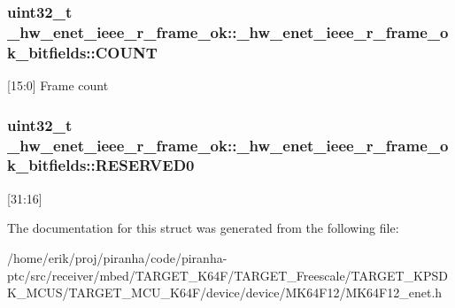 \subsubsection[{\texorpdfstring{C\+O\+U\+NT}{COUNT}}]{\setlength{\rightskip}{0pt plus 5cm}uint32\+\_\+t \+\_\+hw\+\_\+enet\+\_\+ieee\+\_\+r\+\_\+frame\+\_\+ok\+::\+\_\+hw\+\_\+enet\+\_\+ieee\+\_\+r\+\_\+frame\+\_\+ok\+\_\+bitfields\+::\+C\+O\+U\+NT}\hypertarget{struct__hw__enet__ieee__r__frame__ok_1_1__hw__enet__ieee__r__frame__ok__bitfields_a4793c31c95d197d18dbfbf388a42f13a}{}\label{struct__hw__enet__ieee__r__frame__ok_1_1__hw__enet__ieee__r__frame__ok__bitfields_a4793c31c95d197d18dbfbf388a42f13a}
\mbox{[}15\+:0\mbox{]} Frame count 
\subsubsection[{\texorpdfstring{R\+E\+S\+E\+R\+V\+E\+D0}{RESERVED0}}]{\setlength{\rightskip}{0pt plus 5cm}uint32\+\_\+t \+\_\+hw\+\_\+enet\+\_\+ieee\+\_\+r\+\_\+frame\+\_\+ok\+::\+\_\+hw\+\_\+enet\+\_\+ieee\+\_\+r\+\_\+frame\+\_\+ok\+\_\+bitfields\+::\+R\+E\+S\+E\+R\+V\+E\+D0}\hypertarget{struct__hw__enet__ieee__r__frame__ok_1_1__hw__enet__ieee__r__frame__ok__bitfields_a86b10c7c8f995539d664c7d60da16fd8}{}\label{struct__hw__enet__ieee__r__frame__ok_1_1__hw__enet__ieee__r__frame__ok__bitfields_a86b10c7c8f995539d664c7d60da16fd8}
\mbox{[}31\+:16\mbox{]} 

The documentation for this struct was generated from the following file\+:\begin{DoxyCompactItemize}
\item 
/home/erik/proj/piranha/code/piranha-\/ptc/src/receiver/mbed/\+T\+A\+R\+G\+E\+T\+\_\+\+K64\+F/\+T\+A\+R\+G\+E\+T\+\_\+\+Freescale/\+T\+A\+R\+G\+E\+T\+\_\+\+K\+P\+S\+D\+K\+\_\+\+M\+C\+U\+S/\+T\+A\+R\+G\+E\+T\+\_\+\+M\+C\+U\+\_\+\+K64\+F/device/device/\+M\+K64\+F12/M\+K64\+F12\+\_\+enet.\+h\end{DoxyCompactItemize}

